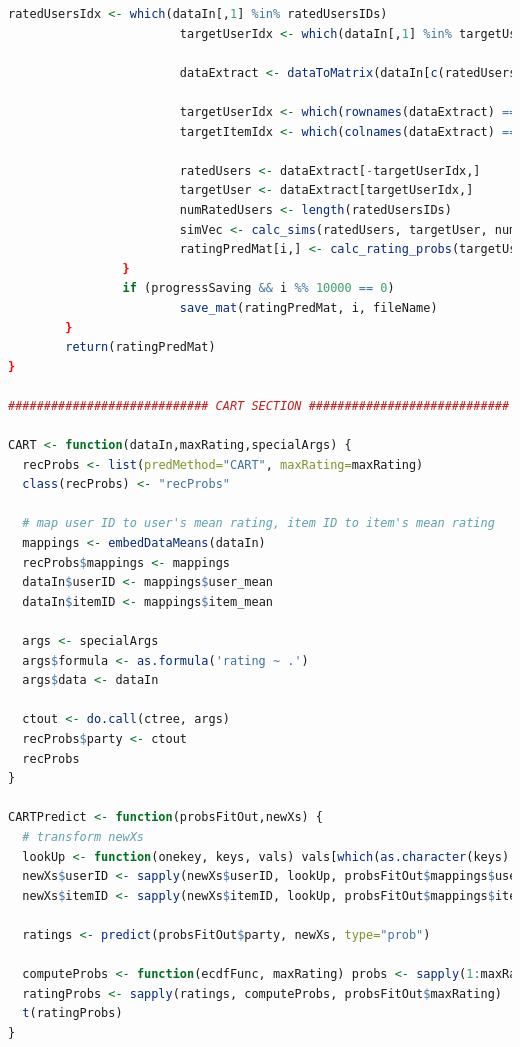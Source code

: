 \documentclass{article}
\begin{document}
\begin{lstlisting}[language=R]
                        ratedUsersIdx <- which(dataIn[,1] %in% ratedUsersIDs)
                        targetUserIdx <- which(dataIn[,1] %in% targetUserID)

                        dataExtract <- dataToMatrix(dataIn[c(ratedUsersIdx,targetUserIdx),])

                        targetUserIdx <- which(rownames(dataExtract) == newXs[i,1])
                        targetItemIdx <- which(colnames(dataExtract) == newXs[i,2])

                        ratedUsers <- dataExtract[-targetUserIdx,]
                        targetUser <- dataExtract[targetUserIdx,]
                        numRatedUsers <- length(ratedUsersIDs)
                        simVec <- calc_sims(ratedUsers, targetUser, numRatedUsers)
                        ratingPredMat[i,] <- calc_rating_probs(targetUser, targetItemIdx,ratedUsers, simVec, k, maxRating)
                }
                if (progressSaving && i %% 10000 == 0)
                        save_mat(ratingPredMat, i, fileName)
        }
        return(ratingPredMat)
}

############################ CART SECTION ############################

CART <- function(dataIn,maxRating,specialArgs) {
  recProbs <- list(predMethod="CART", maxRating=maxRating)
  class(recProbs) <- "recProbs"

  # map user ID to user's mean rating, item ID to item's mean rating
  mappings <- embedDataMeans(dataIn)
  recProbs$mappings <- mappings
  dataIn$userID <- mappings$user_mean
  dataIn$itemID <- mappings$item_mean

  args <- specialArgs
  args$formula <- as.formula('rating ~ .')
  args$data <- dataIn

  ctout <- do.call(ctree, args)
  recProbs$party <- ctout
  recProbs
}

CARTPredict <- function(probsFitOut,newXs) {
  # transform newXs
  lookUp <- function(onekey, keys, vals) vals[which(as.character(keys) == as.character(onekey))[1]]
  newXs$userID <- sapply(newXs$userID, lookUp, probsFitOut$mappings$userID, probsFitOut$mappings$user_mean)
  newXs$itemID <- sapply(newXs$itemID, lookUp, probsFitOut$mappings$itemID, probsFitOut$mappings$item_mean)

  ratings <- predict(probsFitOut$party, newXs, type="prob")

  computeProbs <- function(ecdfFunc, maxRating) probs <- sapply(1:maxRating, function(rating) ecdfFunc(rating + 0.5) - ecdfFunc(rating - 0.5))
  ratingProbs <- sapply(ratings, computeProbs, probsFitOut$maxRating)
  t(ratingProbs)
}


\end{lstlisting}
\end{document}
